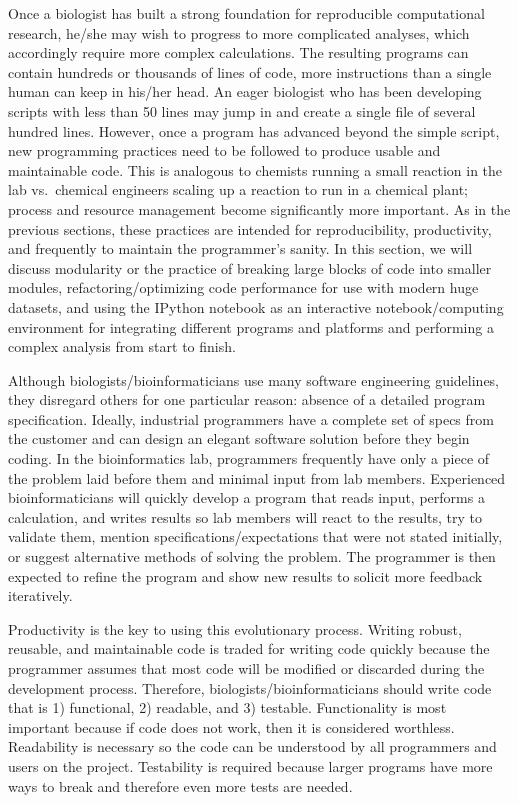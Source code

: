 \documentclass[ChapterTOCs,krantz2]{krantz} %
\begin{document}
Once a biologist has built a strong foundation for reproducible computational
research, he/she may wish to progress to more complicated analyses, which
accordingly require more complex calculations.  The resulting programs can
contain hundreds or thousands of lines of code, more instructions than a single
human can keep in his/her head.  An eager biologist who has been developing 
scripts with less than 50 lines may jump in and create a single file of
several hundred lines.  However, once a program has advanced beyond the
simple script, new programming practices need to be followed to produce usable
and maintainable code.  This is analogous to chemists running a small reaction
in the lab vs.\ chemical engineers scaling up a reaction to run in a chemical
plant; process and resource management become significantly more important.  As in the
previous sections, these practices are intended for reproducibility,
productivity, and frequently to maintain the programmer's sanity.  In this
section, we will discuss modularity or the practice of breaking large blocks of
code into smaller modules, refactoring/optimizing code performance for use with
modern huge datasets, and using the IPython notebook as an interactive
notebook/computing environment for integrating different programs and platforms
and performing a complex analysis from start to finish.

Although biologists/bioinformaticians use many software engineering guidelines, 
they disregard others for one particular reason:
absence of a detailed program specification\cite{Segal2007}.  Ideally, industrial
programmers have a complete set of specs from the customer 
and can design an elegant software solution before they begin
coding.  In the bioinformatics lab, programmers frequently have only a piece of
the problem laid before them and minimal input from lab members.  
Experienced bioinformaticians will quickly
develop a program that reads input, performs a calculation, and writes
results so lab members will react to the results, try to validate them, mention
specifications/expectations that were not stated initially, or
suggest alternative methods of solving the problem.  The programmer is then
expected to refine the program and show new results to
solicit more feedback iteratively. 

Productivity is the key to using this evolutionary process.  
Writing robust, reusable, and maintainable code is traded for
writing code quickly because the programmer assumes that most code will be
modified or discarded during the development process.  Therefore,
biologists/bioinformaticians should write code that is 1) functional, 2)
readable, and 3) testable.  Functionality is most important because if code
does not work, then it is considered worthless\cite{Kelly2008}.
Readability is necessary so the code can be understood by all programmers and users
on the project.  
Testability is required
because larger programs have more ways to break and therefore even more tests
are needed.
\end{document}
